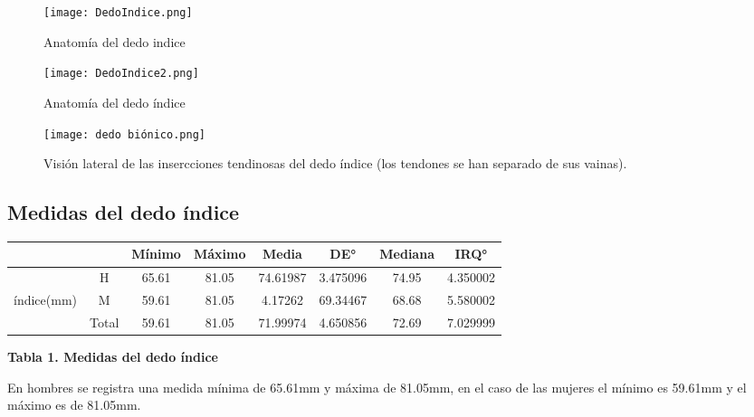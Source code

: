 \documentclass{article}
\begin{document}
\begin{figure} [htp]%
    \centering
    \texttt{[image: DedoIndice.png]} %
    \caption{Anatomía del dedo indice}
    \label{grafica}
\end{figure}
 
 \begin{figure} [htp]%
    \centering
    \texttt{[image: DedoIndice2.png]} %
    \caption{Anatomía del dedo índice}
    \label{grafica}
\end{figure}
\newpage

 \begin{figure} [htp]%
    \centering
    \texttt{[image: dedo biónico.png]} %
    \caption{Visión lateral de las insercciones tendinosas del dedo índice (los tendones se han separado de sus vainas).}
    \label{grafica}
\end{figure}

\subsection{\textbf{Medidas del dedo índice}}

\begin{table}[H]
\begin{center}
\label{table1} 
\begin{tabular}{cccccccc} %
\hline
\multicolumn{1}{c}{} & \multicolumn{1}{c}{} & \multicolumn{1}{c}{Mínimo}& \multicolumn{1}{c}{Máximo} & 
\multicolumn{1}{c}{Media} & \multicolumn{1}{c}{DE°}& \multicolumn{1}{c}{Mediana} & \multicolumn{1}{c}{IRQ°} \\
\hline
&  H & 65.61 & 81.05 & 74.61987 & 3.475096 & 74.95 & 4.350002\\
índice(mm)   &  M & 59.61 & 81.05 & 4.17262 & 69.34467 & 68.68 & 5.580002\\
&  Total & 59.61 & 81.05 & 71.99974 & 4.650856 & 72.69 & 7.029999\\

\hline
\end{tabular}
\end{center}
\end{table}
\begin{center} \textbf {Tabla 1. Medidas del dedo índice} \end{center}

En hombres se registra una medida mínima de 65.61mm y máxima de 81.05mm, en el caso de las mujeres el mínimo es 59.61mm y el máximo es de 81.05mm.
\end{document}
